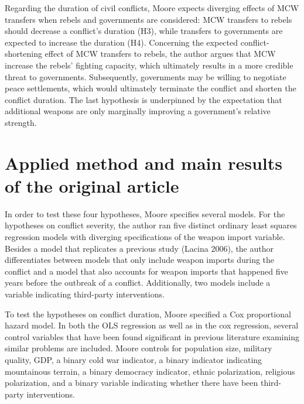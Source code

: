 \documentclass[
]{article}
\begin{document}
Regarding the duration of civil conflicts, Moore expects diverging
effects of MCW transfers when rebels and governments are considered: MCW
transfers to rebels should decrease a conflict's duration (H3), while
transfers to governments are expected to increase the duration (H4).
Concerning the expected conflict-shortening effect of MCW transfers to
rebels, the author argues that MCW increase the rebels' fighting
capacity, which ultimately results in a more credible threat to
governments. Subsequently, governments may be willing to negotiate peace
settlements, which would ultimately terminate the conflict and shorten
the conflict duration. The last hypothesis is underpinned by the
expectation that additional weapons are only marginally improving a
government's relative strength.

\hypertarget{applied-method-and-main-results-of-the-original-article}{%
\section{Applied method and main results of the original
article}\label{applied-method-and-main-results-of-the-original-article}}

In order to test these four hypotheses, Moore specifies several models.
For the hypotheses on conflict severity, the author ran five distinct
ordinary least squares regression models with diverging specifications
of the weapon import variable. Besides a model that replicates a
previous study (Lacina 2006), the author differentiates between models
that only include weapon imports during the conflict and a model that
also accounts for weapon imports that happened five years before the
outbreak of a conflict. Additionally, two models include a variable
indicating third-party interventions.

To test the hypotheses on conflict duration, Moore specified a Cox
proportional hazard model. In both the OLS regression as well as in the
cox regression, several control variables that have been found
significant in previous literature examining similar problems are
included. Moore controls for population size, military quality, GDP, a
binary cold war indicator, a binary indicator indicating mountainous
terrain, a binary democracy indicator, ethnic polarization, religious
polarization, and a binary variable indicating whether there have been
third-party interventions.
\end{document}
